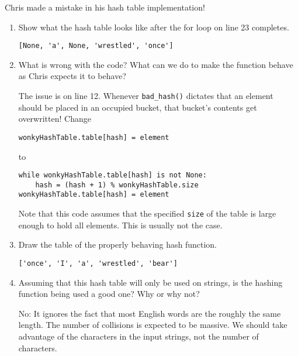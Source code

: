 %
%


Chris made a mistake in his hash table implementation!

    

    \begin{enumerate}
    \item Show what the hash table looks like after the for loop on line 23
          completes.

        \begin{answer}
		\begin{lstlisting}[numbers=none]
[None, 'a', None, 'wrestled', 'once']
		\end{lstlisting}
        \end{answer}

    \item What is wrong with the code? What can we do to make the function behave as Chris expects it to behave?

        \begin{answer}
        The issue is on line 12. Whenever \texttt{bad\_hash()} dictates that an element should be placed in an occupied bucket, that bucket's contents get overwritten! Change 
\begin{lstlisting}[numbers=none, basicstyle=\ttfamily]
wonkyHashTable.table[hash] = element
\end{lstlisting} to
\begin{lstlisting}[numbers=none, basicstyle=\ttfamily]
while wonkyHashTable.table[hash] is not None:
	hash = (hash + 1) % wonkyHashTable.size
wonkyHashTable.table[hash] = element
\end{lstlisting}

Note that this code assumes that the specified \texttt{size} of the table is large enough to hold all elements.  This is usually not the case.
        \end{answer}

    \item Draw the table of the properly behaving hash function.

        \begin{answer}
		\begin{lstlisting}[numbers=none]
['once', 'I', 'a', 'wrestled', 'bear']
		\end{lstlisting}
    \end{answer}
\item Assuming that this hash table will only be used on strings, is the hashing function being used a good one? Why or why not?

    \begin{answer}
        No: It ignores the fact that most English words are the roughly the same length. The number of collisions is expected to be massive. We should take advantage of the characters in the input strings, not the number of characters.
    \end{answer}
    \end{enumerate}